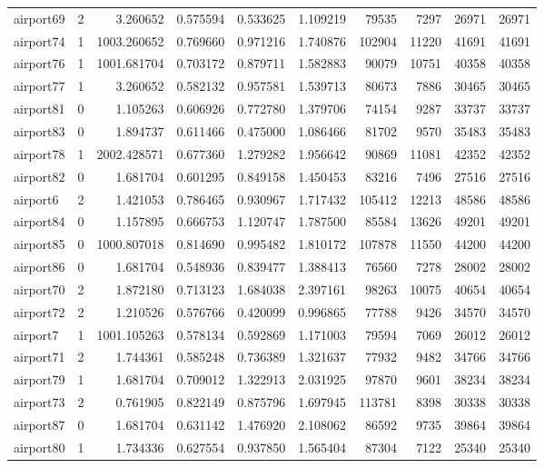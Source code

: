 \begin{longtable}{|l|r|r|r|r|r|r|r|r|r|}
airport69 & 2 & 3.260652 & 0.575594 & 0.533625 & 1.109219 & 79535 & 7297 & 26971 & 26971 \\
airport74 & 1 & 1003.260652 & 0.769660 & 0.971216 & 1.740876 & 102904 & 11220 & 41691 & 41691 \\
airport76 & 1 & 1001.681704 & 0.703172 & 0.879711 & 1.582883 & 90079 & 10751 & 40358 & 40358 \\
airport77 & 1 & 3.260652 & 0.582132 & 0.957581 & 1.539713 & 80673 & 7886 & 30465 & 30465 \\
airport81 & 0 & 1.105263 & 0.606926 & 0.772780 & 1.379706 & 74154 & 9287 & 33737 & 33737 \\
airport83 & 0 & 1.894737 & 0.611466 & 0.475000 & 1.086466 & 81702 & 9570 & 35483 & 35483 \\
airport78 & 1 & 2002.428571 & 0.677360 & 1.279282 & 1.956642 & 90869 & 11081 & 42352 & 42352 \\
airport82 & 0 & 1.681704 & 0.601295 & 0.849158 & 1.450453 & 83216 & 7496 & 27516 & 27516 \\
airport6 & 2 & 1.421053 & 0.786465 & 0.930967 & 1.717432 & 105412 & 12213 & 48586 & 48586 \\
airport84 & 0 & 1.157895 & 0.666753 & 1.120747 & 1.787500 & 85584 & 13626 & 49201 & 49201 \\
airport85 & 0 & 1000.807018 & 0.814690 & 0.995482 & 1.810172 & 107878 & 11550 & 44200 & 44200 \\
airport86 & 0 & 1.681704 & 0.548936 & 0.839477 & 1.388413 & 76560 & 7278 & 28002 & 28002 \\
airport70 & 2 & 1.872180 & 0.713123 & 1.684038 & 2.397161 & 98263 & 10075 & 40654 & 40654 \\
airport72 & 2 & 1.210526 & 0.576766 & 0.420099 & 0.996865 & 77788 & 9426 & 34570 & 34570 \\
airport7 & 1 & 1001.105263 & 0.578134 & 0.592869 & 1.171003 & 79594 & 7069 & 26012 & 26012 \\
airport71 & 2 & 1.744361 & 0.585248 & 0.736389 & 1.321637 & 77932 & 9482 & 34766 & 34766 \\
airport79 & 1 & 1.681704 & 0.709012 & 1.322913 & 2.031925 & 97870 & 9601 & 38234 & 38234 \\
airport73 & 2 & 0.761905 & 0.822149 & 0.875796 & 1.697945 & 113781 & 8398 & 30338 & 30338 \\
airport87 & 0 & 1.681704 & 0.631142 & 1.476920 & 2.108062 & 86592 & 9735 & 39864 & 39864 \\
airport80 & 1 & 1.734336 & 0.627554 & 0.937850 & 1.565404 & 87304 & 7122 & 25340 & 25340 \\

\end{longtable}
